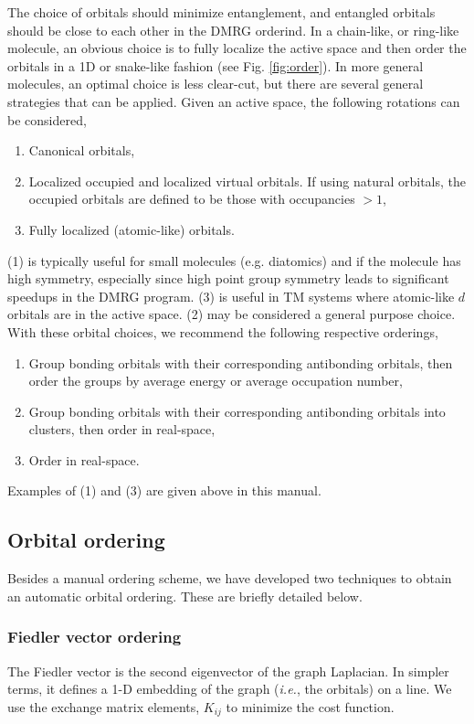 \documentclass[letterpaper,12pt,aps, pra]{revtex4-1}
\begin{document}
The choice of orbitals should
minimize entanglement, and entangled orbitals should be close to each other in the DMRG orderind.
In a chain-like, or ring-like molecule, an obvious choice is to fully localize the active space and then order the orbitals in a 1D or snake-like fashion (see Fig. \ref{fig:order}). In
more general molecules, an optimal choice is less clear-cut, but there are several general strategies that can be applied. Given an active space, the following rotations can be considered,
\begin{enumerate}
\item Canonical orbitals,
\item Localized occupied and localized virtual orbitals. If using natural orbitals, the occupied orbitals are defined to be those with occupancies $>1$,
\item Fully localized (atomic-like) orbitals.
\end{enumerate}
(1) is typically useful for small molecules (e.g. diatomics) and if the molecule has high symmetry, especially since high point group symmetry leads to significant speedups in the DMRG program.
(3) is useful in TM systems where atomic-like $d$ orbitals are in the active space. (2) may be considered a general purpose choice. With these orbital choices,
we recommend the following respective orderings,
\begin{enumerate}
\item Group bonding orbitals with their corresponding antibonding orbitals, then order the groups by average energy or average occupation number,
\item Group bonding orbitals with their corresponding antibonding orbitals into clusters, then order in real-space,
\item Order in real-space.
\end{enumerate}

Examples of (1) and (3) are given above in this manual. 

\subsection{Orbital ordering}

Besides a manual ordering scheme,  we have developed two techniques to obtain
an automatic orbital ordering. These are briefly detailed below. 

\subsubsection{Fiedler vector ordering}
The Fiedler vector is the second eigenvector of the graph Laplacian. In
simpler terms, it defines a 1-D embedding of the graph (\textit{i.e.}, the
orbitals) on a line. We use the exchange matrix elements, $K_{ij}$ to minimize
the cost function.
\end{document}
